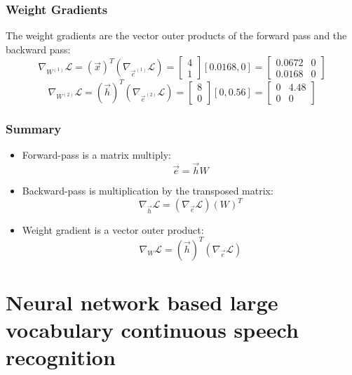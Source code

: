 \documentclass{beamer}
\begin{document}
\begin{frame}
  \frametitle{Weight Gradients}

  The weight gradients are the vector outer products of the
  forward pass and the backward pass:
  \begin{displaymath}
    \nabla_{W^{(1)}}{\mathcal L}
    = \left(\vec{x}\right)^T\left(\nabla_{\vec{e}^{(1)}}{\mathcal L}\right) =
    \left[\begin{array}{c}4\\1\end{array}\right]\left[0.0168,0\right]=
    \left[\begin{array}{cc}0.0672&0\\0.0168&0\end{array}\right]
  \end{displaymath}
  \begin{displaymath}
    \nabla_{W^{(2)}}{\mathcal L}
    = \left(\vec{h}\right)^T\left(\nabla_{\vec{e}^{(2)}}{\mathcal L}\right) =
    \left[\begin{array}{c}8\\0\end{array}\right]\left[0,0.56\right]=
    \left[\begin{array}{cc}0&4.48\\0&0\end{array}\right]
  \end{displaymath}
\end{frame}

\begin{frame}
  \frametitle{Summary}
  \begin{itemize}
  \item Forward-pass is a matrix multiply:
    \[
    \vec{e} = \vec{h}W
    \]
  \item Backward-pass is multiplication by the transposed matrix:
    \[
    \nabla_{\vec{h}}{\mathcal L} = \left(\nabla_{\vec{e}}{\mathcal L}\right)\left(W\right)^T
    \]
  \item Weight gradient is a vector outer product:
    \[
    \nabla_{W}{\mathcal L} = \left(\vec{h}\right)^T\left(\nabla_{\vec{e}}{\mathcal L}\right)
    \]
  \end{itemize}
\end{frame}
     
\section[LVCSR]{Neural network based large vocabulary continuous speech recognition}
\setcounter{subsection}{1}
\end{document}
